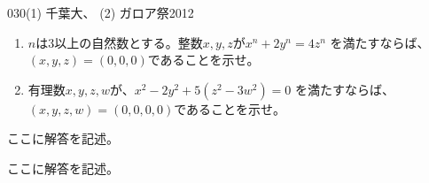 \begin{thm}{030}{}{(1) 千葉大、 (2) ガロア祭2012}
 \begin{enumerate}
  \item $n$は3以上の自然数とする。整数$x,y,z$が$x^n+2y^n=4z^n$ を満たすならば、$(x,y,z)=(0,0,0)$であることを示せ。
  \item 有理数$x,y,z,w$が、$x^2-2y^2+5(z^2-3w^2)=0$ を満たすならば、$(x,y,z,w)=(0,0,0,0)$であることを示せ。
 \end{enumerate}
\end{thm}

ここに解答を記述。

ここに解答を記述。